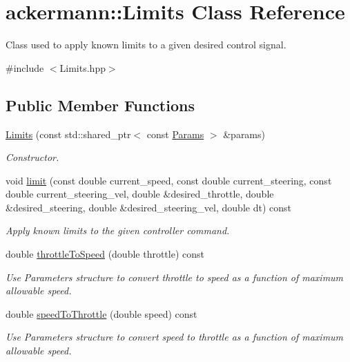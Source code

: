 \hypertarget{classackermann_1_1_limits}{}\section{ackermann\+:\+:Limits Class Reference}
\label{classackermann_1_1_limits}


Class used to apply known limits to a given desired control signal.  




{\ttfamily \#include $<$Limits.\+hpp$>$}

\subsection*{Public Member Functions}
\begin{DoxyCompactItemize}
\item 
\hyperlink{classackermann_1_1_limits_ab33a83c243c38ae9f046c77d49a6de58}{Limits} (const std\+::shared\+\_\+ptr$<$ const \hyperlink{structackermann_1_1_params}{Params} $>$ \&params)
\begin{DoxyCompactList}\small\item\em Constructor. \end{DoxyCompactList}\item 
void \hyperlink{classackermann_1_1_limits_a1fcf66ef8f8161d38e3d77c1e5acfb92}{limit} (const double current\+\_\+speed, const double current\+\_\+steering, const double current\+\_\+steering\+\_\+vel, double \&desired\+\_\+throttle, double \&desired\+\_\+steering, double \&desired\+\_\+steering\+\_\+vel, double dt) const
\begin{DoxyCompactList}\small\item\em Apply known limits to the given controller command. \end{DoxyCompactList}\item 
double \hyperlink{classackermann_1_1_limits_a0e75c61fc7d5d90c6f64af78d8cf76ff}{throttle\+To\+Speed} (double throttle) const
\begin{DoxyCompactList}\small\item\em Use Parameters structure to convert throttle to speed as a function of maximum allowable speed. \end{DoxyCompactList}\item 
double \hyperlink{classackermann_1_1_limits_abb347d9d57d22dfe47ef704ea6d10d7d}{speed\+To\+Throttle} (double speed) const
\begin{DoxyCompactList}\small\item\em Use Parameters structure to convert speed to throttle as a function of maximum allowable speed. \end{DoxyCompactList}\item 

\end{DoxyCompactItemize}
